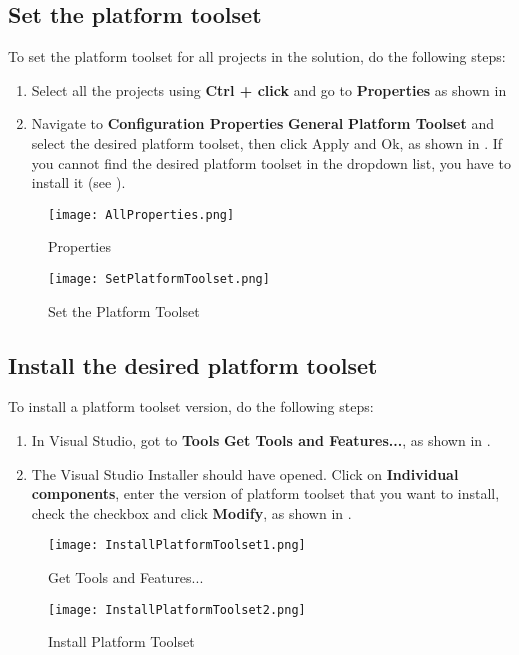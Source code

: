 \begin{appendices}
\subsection{Set the platform toolset}
\label{sect:SetPlatformToolset}

To set the platform toolset for all projects in the solution, do the following steps:
\begin{enumerate}
	\item Select all the projects using \textbf{Ctrl + click} and go to \textbf{Properties} as 
		  shown in 
	\item Navigate to \textbf{Configuration Properties} \textrightarrow \textbf{General} \textrightarrow \textbf{Platform Toolset}
		  and select the desired platform toolset, then click Apply and Ok, as shown in .
		  If you cannot find the desired platform toolset in the dropdown list, you have to install it
		  (see ).
\end{enumerate}
\begin{figure}[]
	\centering
	\texttt{[image: AllProperties.png]}
	\caption{Properties}
	\label{fig:AllProperties}
\end{figure}
\begin{figure}[]
	\centering
	\texttt{[image: SetPlatformToolset.png]}
	\caption{Set the Platform Toolset}
	\label{fig:SetPlatformToolset}
\end{figure}

\subsection{Install the desired platform toolset}
\label{sect:InstallPlatformToolset}

To install a platform toolset version, do the following steps:
\begin{enumerate}
	\item In Visual Studio, got to \textbf{Tools} \textrightarrow \textbf{Get Tools and Features...}, 
		  as shown in .
	\item The Visual Studio Installer should have opened. Click on \textbf{Individual components}, 
		  enter the version of platform toolset that you want to install, check the checkbox and click \textbf{Modify},
		  as shown in .
\end{enumerate}
\begin{figure}[]
	\centering
	\texttt{[image: InstallPlatformToolset1.png]}
	\caption{Get Tools and Features...}
	\label{fig:InstallPlatformToolset1}
\end{figure}
\begin{figure}[]
	\centering
	\texttt{[image: InstallPlatformToolset2.png]}
	\caption{Install Platform Toolset}
	\label{fig:InstallPlatformToolset2}
\end{figure}


\end{appendices}
